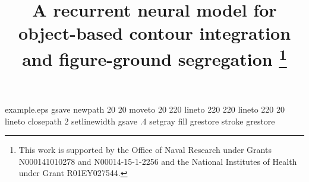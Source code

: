 %
%
%
%
%
\begin{filecontents*}{example.eps}
gsave
newpath
  20 20 moveto
  20 220 lineto
  220 220 lineto
  220 20 lineto
closepath
2 setlinewidth
gsave
  .4 setgray fill
grestore
stroke
grestore
\end{filecontents*}
%
\RequirePackage{fix-cm}
%
\documentclass[twocolumn]{svjour3}          %
%
\smartqed  %
%
\usepackage{graphicx}
%
%
\usepackage{amsmath}
\usepackage{siunitx} %
\usepackage[authoryear]{natbib}
%
\long{} %
\usepackage{xspace}
\newcommand{\ie}[0]{{\em i.e.}\xspace}
\newcommand{\eg}[0]{{\em e.g.}\xspace}
\newcommand{\etal}[0]{{\em et al.}\xspace}
\newcommand{\etc}[0]{{\em etc.}\xspace}
\newcommand{\vs}[0]{{\em vs.}\xspace}
\newcommand{\vv}[0]{{\em vice-versa}\xspace}
\newcommand{\via}[0]{{\em via}\xspace}
\newcommand{\ibid}[0]{{\em ibid}\xspace}
%
%


\title{A recurrent neural model for 
%
object-based
%
 contour integration and figure-ground segregation
 \thanks{
 This work is supported by the Office of Naval Research under Grants
 N000141010278 
 and N00014-15-1-2256 
 and the National Institutes of Health under Grant
 R01EY027544.}
}

